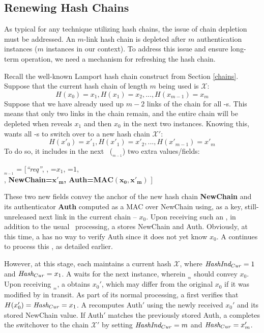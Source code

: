 \subsection{Renewing Hash Chains \label{renewal}}
%
As typical for any technique utilizing hash chains, the issue of chain depletion must
be addressed. An $m$-link hash chain is depleted after $m$ authentication instances
($m$ \sa instances in our context). To address this issue and ensure 
long-term operation, we need a mechanism for refreshing the hash chain. 

Recall the well-known Lamport hash chain construct from Section \ref{chains}. 
Suppose that the current hash chain of length $m$ being used is ${\mathcal X}$:
$$
H(x_0) = x_1, H(x_1) = x_2, ... , H(x_{m-1})=x_m
$$
Suppose that we have already used up $m-2$ links of the chain for all \prv-s. 
This means that only two links in the chain remain, and the entire chain will be depleted when \vrf reveals $x_1$ and then
$x_0$ in the next two \sa instances. Knowing this, \vrf wants all \prv-s 
to switch over to a new hash chain ${\mathcal X'}$:
$$
H(x'_0) = x'_1, H(x'_1) = x'_2, ... , H(x'_{m-1})=x'_m
$$
To do so, it includes in the next \Attreq\ (\Attreq$_{_{m-1}}$) two extra values/fields:
\begin{center}
\noindent 
\Attreq$_{_{m-1}}$ = [\textit{``req''}, \snd, \hash=$x_1$, \hashind=$1$, \\
\attesttime, {\bf NewChain=$\boldsymbol{x'_m}$, Auth=$\boldsymbol{MAC(x_0,x'_m)}$} ]
\end{center}
%
These two new fields convey the anchor of the new hash chain {\bf NewChain} and its authenticator {\bf Auth} 
computed as a MAC over NewChain using, as a key, still-unreleased next link in the current chain -- $x_0$. 
Upon receiving such an \Attreq, in addition to the usual \Attreq \ processing, 
a \prv stores NewChain and Auth. Obviously, at this time, a \prv has no way to 
verify Auth since it does not yet know $x_0$. A \prv continues to process this \Attreq,
as detailed earlier.

However, at this stage, each \prv{} maintains a current hash ${\mathcal X}$, where 
$\textit {HashInd$_{Cur}$}=1$ and $\textit{Hash$_{Cur}$}=x_1$. A \prv waits for the next \sa instance, wherein 
\Attreq$_{_m}$ should convey $x_0$. Upon receiving \Attreq$_{_m}$, a \prv obtains 
$x_0'$, which may differ from the original $x_0$ if it was modified by \sadv in transit.
As part of its normal processing, a \prv first verifies that $H(x_0')=\textit{Hash$_{Cur}$}=x_1$. 
A \prv recomputes Auth$'$ using the newly received $x_0'$ and its stored NewChain value. 
If Auth$'$ matches the previously stored Auth, a \prv completes the switchover 
to the chain ${\mathcal X'}$ by setting $\textit {HashInd$_{Cur}$}=m$ and $\textit{Hash$_{Cur}$}=x'_m$. 

